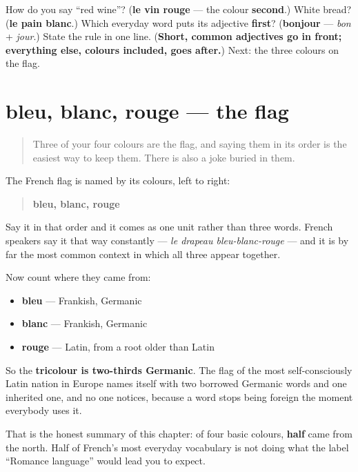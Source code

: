 \begin{tcolorbox}[breakable,colback=teal!4,colframe=teal!35!black,title={Before you move on}]
How do you say \textquotedblleft{}red wine\textquotedblright{}? (\textbf{le vin rouge} — the colour \textbf{second}.) White bread? (\textbf{le pain blanc}.) Which everyday word puts its adjective \textbf{first}? (\textbf{bonjour} — \emph{bon} + \emph{jour}.) State the rule in one line. (\textbf{Short, common adjectives go in front; everything else, colours included, goes after.}) Next: the three colours on the flag.
\end{tcolorbox}
\section[bleu, blanc, rouge]{bleu, blanc, rouge — the flag}

\label{lesson:FR-C13-tricolore}



\begin{quote}
Three of your four colours are the flag, and saying them in its order is the easiest way to keep them. There is also a joke buried in them.
\end{quote}

\begin{culture}
The French flag is named by its colours, left to right:

\begin{quote}
\textbf{bleu, blanc, rouge}
\end{quote}

Say it in that order and it comes as one unit rather than three words. French speakers say it that way constantly — \emph{le drapeau bleu-blanc-rouge} — and it is by far the most common context in which all three appear together.

Now count where they came from:

\begin{itemize}
\raggedright
  \item \textbf{bleu} — Frankish, Germanic
  \item \textbf{blanc} — Frankish, Germanic
  \item \textbf{rouge} — Latin, from a root older than Latin
\end{itemize}

So the \textbf{tricolour is two-thirds Germanic}. The flag of the most self-consciously Latin nation in Europe names itself with two borrowed Germanic words and one inherited one, and no one notices, because a word stops being foreign the moment everybody uses it.

That is the honest summary of this chapter: of four basic colours, \textbf{half} came from the north. Half of French's most everyday vocabulary is not doing what the label \textquotedblleft{}Romance language\textquotedblright{} would lead you to expect.
\end{culture}

